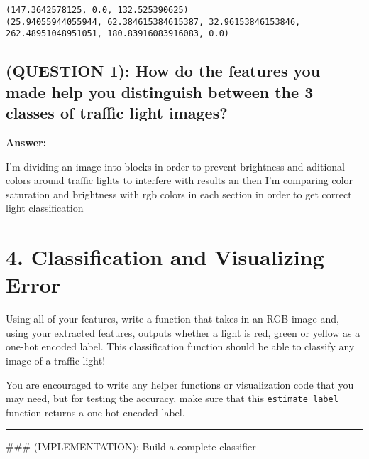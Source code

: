 \documentclass[11pt]{article}
\begin{document}
    \begin{Verbatim}[commandchars=\\\{\}]
(147.3642578125, 0.0, 132.525390625)
(25.94055944055944, 62.384615384615387, 32.96153846153846, 262.48951048951051, 180.83916083916083, 0.0)

    \end{Verbatim}

    \hypertarget{question-1-how-do-the-features-you-made-help-you-distinguish-between-the-3-classes-of-traffic-light-images}{%
\subsection{(QUESTION 1): How do the features you made help you
distinguish between the 3 classes of traffic light
images?}\label{question-1-how-do-the-features-you-made-help-you-distinguish-between-the-3-classes-of-traffic-light-images}}

    \textbf{Answer:}

I'm dividing an image into blocks in order to prevent brightness and
aditional colors around traffic lights to interfere with results an then
I'm comparing color saturation and brightness with rgb colors in each
section in order to get correct light classification

    \hypertarget{classification-and-visualizing-error}{%
\section{4. Classification and Visualizing
Error}\label{classification-and-visualizing-error}}

Using all of your features, write a function that takes in an RGB image
and, using your extracted features, outputs whether a light is red,
green or yellow as a one-hot encoded label. This classification function
should be able to classify any image of a traffic light!

You are encouraged to write any helper functions or visualization code
that you may need, but for testing the accuracy, make sure that this
\texttt{estimate\_label} function returns a one-hot encoded label.

    \begin{center}\rule{0.5\linewidth}{\linethickness}\end{center}

 \#\#\# (IMPLEMENTATION): Build a complete classifier
\end{document}
